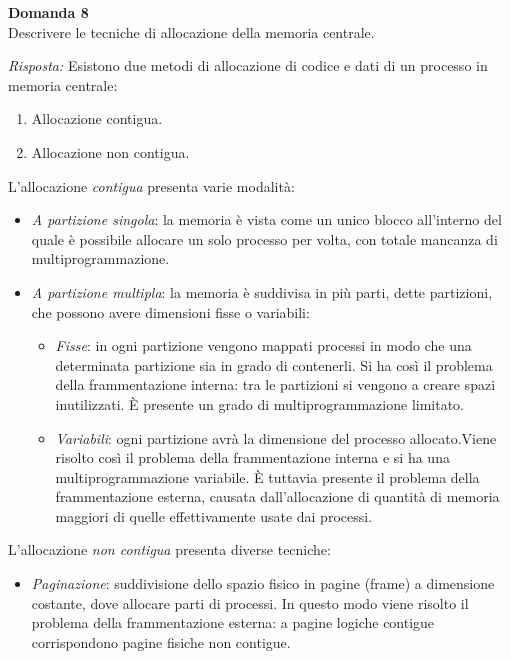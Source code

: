 \documentclass{article}
\newenvironment{problem}[2][Domanda]
    { \begin{mdframed}[backgroundcolor=gray!20] \textbf{#1 #2} \\}
    {  \end{mdframed}}
\newenvironment{solution}
    {\textit{Risposta:}}
    {}
\begin{document}
\begin{problem}{8}
Descrivere le tecniche di allocazione della memoria centrale.
\end{problem}
\begin{solution}
Esistono due metodi di allocazione di codice e dati di un processo in memoria centrale:
\begin{enumerate}
    \item Allocazione contigua.
    \item Allocazione non contigua.
\end{enumerate} 
L’allocazione \textit{contigua} presenta varie modalità:
\begin{itemize}
    \item \emph{A partizione singola}: la memoria è vista come un unico blocco all’interno del quale è possibile allocare un solo processo per volta, con totale mancanza di multiprogrammazione.
    \item \emph{A partizione multipla}: la memoria è suddivisa in più parti, dette partizioni, che possono avere dimensioni fisse o variabili:
    \begin{itemize}
        \item \emph{Fisse}: in ogni partizione vengono mappati processi in modo che una determinata partizione sia in grado di contenerli.
        \newline Si ha così il problema della frammentazione interna: tra le partizioni si vengono a creare spazi inutilizzati.
        \newline
        È presente un grado di multiprogrammazione limitato.
        \item \emph{Variabili}: ogni partizione avrà la dimensione del processo allocato.\newline Viene risolto così il problema della frammentazione interna e si ha una multiprogrammazione variabile.
        \newline È tuttavia presente il problema della frammentazione esterna, causata dall’allocazione di quantità di memoria maggiori di quelle effettivamente usate dai processi.
    \end{itemize}
\end{itemize}
L’allocazione \textit{non contigua} presenta diverse tecniche:
\begin{itemize}
    \item \emph{Paginazione}: suddivisione dello spazio fisico in pagine (frame) a dimensione costante, dove allocare parti di processi.
    \newline In questo modo viene risolto il problema della frammentazione esterna: a pagine logiche contigue corrispondono pagine fisiche non contigue.

\end{itemize}
\end{solution}
\end{document}
